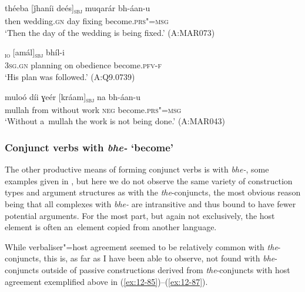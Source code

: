 \begin{exe}
\ex
\label{ex:12-85}
\gll théeba [ǰhaníi deés]\textsubscript{\textsc{sbj}} muqarár bh-áan-u  \\
then wedding.\textsc{gn} day fixing become.\textsc{prs"=msg} \\
\glt `Then the day of the wedding is being fixed.' (A:MAR073)
\end{exe}
\begin{exe}
\ex
\label{ex:12-86}
\textsubscript{\textsc{io}}
     [amál]\textsubscript{\textsc{sbj}} bhíl-i  \\
\textsc{3sg.gn} planning on obedience become.\textsc{pfv-f} \\
\glt `His plan was followed.' (A:Q9.0739)
\end{exe}
\begin{exe}
\ex
\label{ex:12-87}
\gll muloó díi ɣeér [kráam]\textsubscript{\textsc{sbj}} na bh-áan-u  \\
mullah from without work \textsc{neg} become.\textsc{prs"=msg} \\
\glt `Without a~mullah the work is not being done.' (A:MAR043)
\end{exe}

\subsubsection*{Conjunct verbs with \textit{bhe-} `become'}

The other productive means of forming conjunct verbs is with \textit{bhe-}, some examples given in , but here we do not observe the same variety of construction types and argument structures as with the \textit{the}-conjuncts, the most obvious reason being that all complexes with \textit{bhe-} are intransitive and thus bound to have fewer potential arguments. For the most part, but again not exclusively, the host element is often an~element copied from another language. 


While verbaliser"=host agreement seemed to be relatively common with \textit{the}-conjuncts, this is, as far as I have been able to observe, not found with \textit{bhe}-conjuncts outside of passive constructions derived from \textit{the}-conjuncts with host agreement exemplified above in (\ref{ex:12-85})--(\ref{ex:12-87}). 


